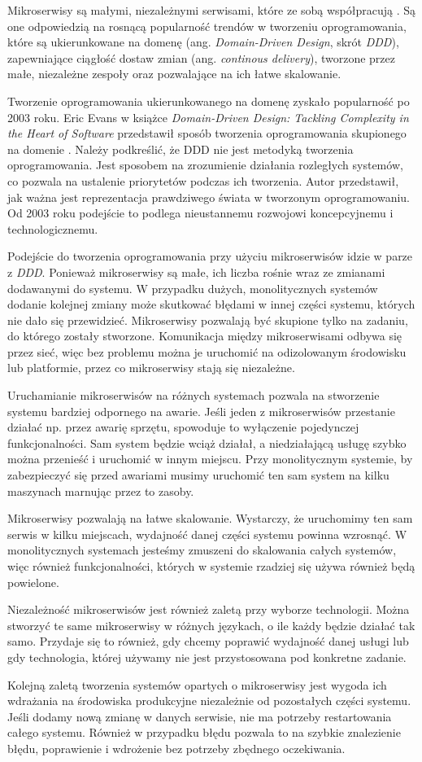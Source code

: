 Mikroserwisy są małymi, niezależnymi serwisami, które ze sobą współpracują \cite{newman}. Są one odpowiedzią na rosnącą popularność trendów w tworzeniu oprogramowania, które są ukierunkowane na domenę (ang. \textsl{Domain-Driven Design}, skrót \textsl{DDD}), zapewniające ciągłość dostaw zmian (ang. \textsl{continous delivery}), tworzone przez małe, niezależne zespoły oraz pozwalające na ich łatwe skalowanie. 

Tworzenie oprogramowania ukierunkowanego na domenę zyskało popularność po 2003 roku. Eric Evans w książce \textsl{Domain-Driven Design: Tackling Complexity in the Heart of Software} przedstawił sposób tworzenia oprogramowania skupionego na domenie \cite{ddd}. Należy podkreślić, że DDD nie jest metodyką tworzenia oprogramowania. Jest sposobem na zrozumienie działania rozległych systemów, co pozwala na ustalenie priorytetów podczas ich tworzenia. Autor przedstawił, jak ważna jest reprezentacja prawdziwego świata w tworzonym oprogramowaniu. Od 2003 roku podejście to podlega nieustannemu rozwojowi koncepcyjnemu i technologicznemu.

Podejście do tworzenia oprogramowania przy użyciu mikroserwisów idzie w parze z \textsl{DDD}. Ponieważ mikroserwisy są małe, ich liczba rośnie wraz ze zmianami dodawanymi do systemu. W przypadku dużych,  monolitycznych systemów dodanie kolejnej zmiany może skutkować błędami w innej części systemu, których nie dało się przewidzieć. Mikroserwisy pozwalają być skupione tylko na zadaniu, do którego zostały stworzone. Komunikacja między mikroserwisami odbywa się przez sieć, więc bez problemu można je uruchomić na odizolowanym środowisku lub platformie, przez co mikroserwisy stają się niezależne. 

Uruchamianie mikroserwisów na różnych systemach pozwala na stworzenie systemu bardziej odpornego na awarie. Jeśli jeden z mikroserwisów przestanie działać np. przez awarię sprzętu, spowoduje to wyłączenie pojedynczej funkcjonalności. Sam system będzie wciąż działał, a niedziałającą usługę szybko można przenieść i uruchomić w innym miejscu. Przy monolitycznym systemie, by zabezpieczyć się przed awariami musimy uruchomić ten sam system na kilku maszynach marnując przez to zasoby.

Mikroserwisy pozwalają na łatwe skalowanie. Wystarczy, że uruchomimy ten sam serwis w kilku miejscach, wydajność danej części systemu powinna wzrosnąć. W monolitycznych systemach jesteśmy zmuszeni do skalowania całych systemów, więc również funkcjonalności, których w systemie rzadziej się używa również będą powielone.

Niezależność mikroserwisów jest również zaletą przy wyborze technologii. Można stworzyć te same mikroserwisy w różnych językach, o ile każdy będzie działać tak samo. Przydaje się to również, gdy chcemy poprawić wydajność danej usługi lub gdy technologia, której używamy nie jest przystosowana pod konkretne zadanie. 

Kolejną zaletą tworzenia systemów opartych o mikroserwisy jest wygoda ich wdrażania na środowiska produkcyjne niezależnie od pozostałych części systemu. Jeśli dodamy nową zmianę w danych serwisie, nie ma potrzeby restartowania całego systemu. Również w przypadku błędu pozwala to na szybkie znalezienie błędu, poprawienie i wdrożenie bez potrzeby zbędnego oczekiwania. 